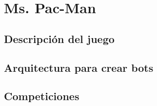 \chapter{Ms. Pac-Man}

\section{Descripción del juego}

\section{Arquitectura para crear bots}

\section{Competiciones}

